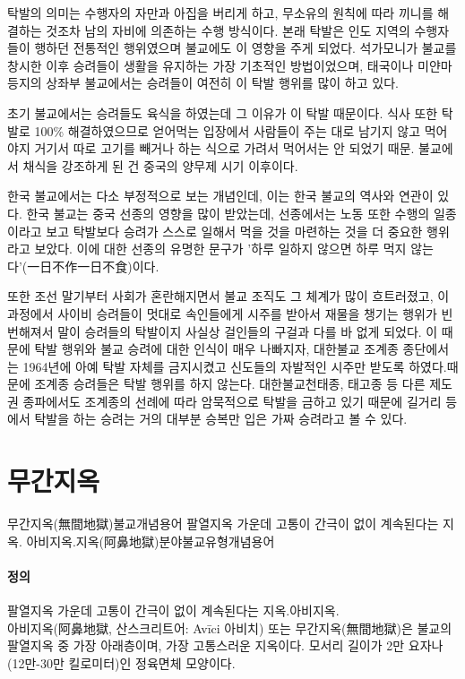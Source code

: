 \documentclass[12pt, a4paper, oneside]{book}
\let\stdsection\section
\renewcommand\section{\newpage\stdsection}
\begin{document}
탁발의 의미는 수행자의 자만과 아집을 버리게 하고, 무소유의 원칙에 따라 끼니를 해결하는 것조차 남의 자비에 의존하는 수행 방식이다. 본래 탁발은 인도 지역의 수행자들이 행하던 전통적인 행위였으며 불교에도 이 영향을 주게 되었다. 석가모니가 불교를 창시한 이후 승려들이 생활을 유지하는 가장 기초적인 방법이었으며, 태국이나 미얀마 등지의 상좌부 불교에서는 승려들이 여전히 이 탁발 행위를 많이 하고 있다.

초기 불교에서는 승려들도 육식을 하였는데 그 이유가 이 탁발 때문이다. 식사 또한 탁발로 100\% 해결하였으므로 얻어먹는 입장에서 사람들이 주는 대로 남기지 않고 먹어야지 거기서 따로 고기를 빼거나 하는 식으로 가려서 먹어서는 안 되었기 때문. 불교에서 채식을 강조하게 된 건 중국의 양무제 시기 이후이다.


한국 불교에서는 다소 부정적으로 보는 개념인데, 이는 한국 불교의 역사와 연관이 있다. 한국 불교는 중국 선종의 영향을 많이 받았는데, 선종에서는 노동 또한 수행의 일종이라고 보고 탁발보다 승려가 스스로 일해서 먹을 것을 마련하는 것을 더 중요한 행위라고 보았다. 이에 대한 선종의 유명한 문구가 '하루 일하지 않으면 하루 먹지 않는다'(一日不作一日不食)이다.

또한 조선 말기부터 사회가 혼란해지면서 불교 조직도 그 체계가 많이 흐트러졌고, 이 과정에서 사이비 승려들이 멋대로 속인들에게 시주를 받아서 재물을 챙기는 행위가 빈번해져서 말이 승려들의 탁발이지 사실상 걸인들의 구걸과 다를 바 없게 되었다.
이 때문에 탁발 행위와 불교 승려에 대한 인식이 매우 나빠지자, 대한불교 조계종 종단에서는 1964년에 아예 탁발 자체를 금지시켰고 신도들의 자발적인 시주만 받도록 하였다.때문에 조계종 승려들은 탁발 행위를 하지 않는다. 대한불교천태종, 태고종 등 다른 제도권 종파에서도 조계종의 선례에 따라 암묵적으로 탁발을 금하고 있기 때문에 길거리 등에서 탁발을 하는 승려는 거의 대부분 승복만 입은 가짜 승려라고 볼 수 있다.





%										
	\section{ 무간지옥 }

	무간지옥(無間地獄)불교개념용어
     팔열지옥 가운데 고통이 간극이 없이 계속된다는 지옥.
     아비지옥.지옥(阿鼻地獄)분야불교유형개념용어
 \paragraph{정의}
            팔열지옥 가운데 고통이 간극이 없이 계속된다는 지옥.아비지옥.\\
		아비지옥(阿鼻地獄, 산스크리트어: Avīci 아비치) 또는 무간지옥(無間地獄)은 불교의 팔열지옥 중 가장 아래층이며, 
		가장 고통스러운 지옥이다.
		모서리 길이가 2만 요자나(12만-30만 킬로미터)인 정육면체 모양이다.
\end{document}
